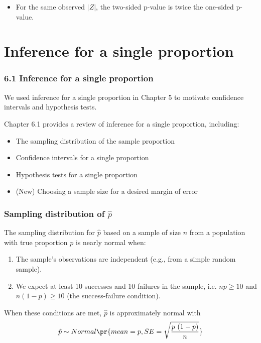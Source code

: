 \documentclass[slidestop,compress,mathserif]{beamer}
\begin{document}
\begin{frame}
\begin{columns}[t]
\end{columns}

\vspace{0.5cm}

\begin{itemize}
\item For the same observed $|Z|$, the two-sided p-value is twice the one-sided p-value.
\end{itemize}

\end{frame}


\section{Inference for a single proportion}


\begin{frame}
\frametitle{6.1 Inference for a single proportion}
We used inference for a single proportion in Chapter 5 to motivate confidence intervals and hypothesis tests.

Chapter 6.1 provides a review of inference for a single proportion, including:
    \begin{itemize}
        \item The sampling distribution of the sample proportion
        \item Confidence intervals for a single proportion
        \item Hypothesis tests for a single proportion
        \item (New) Choosing a sample size for a desired margin of error
    \end{itemize}

\end{frame}


\begin{frame}
\frametitle{Sampling distribution of \(\hat{p}\)}

The sampling distribution for \(\hat{p}\) based on a sample of size \(n\) from a population with true proportion \(p\) is nearly normal when:

\begin{enumerate}
  \item The sample's observations are independent (e.g., from a simple random sample).
  \item We expect at least 10 successes and 10 failures in the sample, i.e. \(np \ge 10\) and \(n(1-p) \ge 10\) (the success-failure condition).
\end{enumerate}

When these conditions are met, \(\hat{p}\) is approximately normal with
\[ \hat{p} \sim Normal \pr{ mean = p, SE = \sqrt{\frac{p~(1-p)}{n}} } \]

\end{frame}
\end{document}
